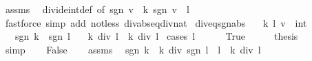 \begin{isabellebody}
\ assms\ \isamarkupfalse%
\ divide{\isacharunderscore}{\kern0pt}int{\isacharunderscore}{\kern0pt}def\ {\isacharbrackleft}{\kern0pt}of\ {\isachardoublequoteopen}sgn\ v\ {\isacharasterisk}{\kern0pt}\ {\isasymbar}k{\isasymbar}{\isachardoublequoteclose}\ {\isachardoublequoteopen}sgn\ v\ {\isacharasterisk}{\kern0pt}\ {\isasymbar}l{\isasymbar}{\isachardoublequoteclose}{\isacharbrackright}{\kern0pt}\isanewline
\ \ \ \ \isamarkupfalse%
\ {\isacharparenleft}{\kern0pt}fastforce\ simp\ add{\isacharcolon}{\kern0pt}\ not{\isacharunderscore}{\kern0pt}less\ div{\isacharunderscore}{\kern0pt}abs{\isacharunderscore}{\kern0pt}eq{\isacharunderscore}{\kern0pt}div{\isacharunderscore}{\kern0pt}nat{\isacharparenright}{\kern0pt}\isanewline
{}\isamarkupfalse%
%
\endisatagproof
{\isafoldproof}%
%
\isadelimproof
\isanewline
%
\endisadelimproof
\isanewline
{}\isamarkupfalse%
\ div{\isacharunderscore}{\kern0pt}eq{\isacharunderscore}{\kern0pt}sgn{\isacharunderscore}{\kern0pt}abs{\isacharcolon}{\kern0pt}\isanewline
\ \ \ k\ l\ v\ {\isacharcolon}{\kern0pt}{\isacharcolon}{\kern0pt}\ int\isanewline
\ \ \ {\isachardoublequoteopen}sgn\ k\ {\isacharequal}{\kern0pt}\ sgn\ l{\isachardoublequoteclose}\isanewline
\ \ \ {\isachardoublequoteopen}k\ div\ l\ {\isacharequal}{\kern0pt}\ {\isasymbar}k{\isasymbar}\ div\ {\isasymbar}l{\isasymbar}{\isachardoublequoteclose}\isanewline
%
\isadelimproof
%
\endisadelimproof
%
\isatagproof
{}\isamarkupfalse%
\ {\isacharparenleft}{\kern0pt}cases\ {\isachardoublequoteopen}l\ {\isacharequal}{\kern0pt}\ {}{\isachardoublequoteclose}{\isacharparenright}{\kern0pt}\isanewline
\ \ \isamarkupfalse%
\ True\isanewline
\ \ \isamarkupfalse%
\ \isamarkupfalse%
\ {\isacharquery}{\kern0pt}thesis\isanewline
\ \ \ \ \isamarkupfalse%
\ simp\isanewline
{}\isamarkupfalse%
\isanewline
\ \ \isamarkupfalse%
\ False\isanewline
\ \ \isamarkupfalse%
\ assms\ \isamarkupfalse%
\ {\isachardoublequoteopen}{\isacharparenleft}{\kern0pt}sgn\ k\ {\isacharasterisk}{\kern0pt}\ {\isasymbar}k{\isasymbar}{\isacharparenright}{\kern0pt}\ div\ {\isacharparenleft}{\kern0pt}sgn\ l\ {\isacharasterisk}{\kern0pt}\ {\isasymbar}l{\isasymbar}{\isacharparenright}{\kern0pt}\ {\isacharequal}{\kern0pt}\ {\isasymbar}k{\isasymbar}\ div\ {\isasymbar}l{\isasymbar}{\isachardoublequoteclose}\isanewline
\ \ \ \ \isamarkupfalse%

\end{isabellebody}
